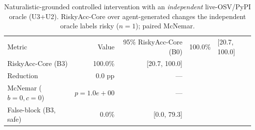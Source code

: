\begin{table}[t]\centering
\caption{Naturalistic-grounded controlled intervention with an \emph{independent} live-OSV/PyPI oracle (U3+U2). RiskyAcc-Core over agent-generated changes the independent oracle labels risky ($n=1$); paired McNemar.}
\label{tab:e1a-indep}
\begin{tabular}{lrr}
\toprule
Metric & Value & 95\%%
\midrule
RiskyAcc-Core (B0) & 100.0\% & [20.7, 100.0] \\
RiskyAcc-Core (B3) & 100.0\% & [20.7, 100.0] \\
Reduction & 0.0 pp & --- \\
McNemar ($b{=}0,c{=}0$) & $p{=}1.0e+00$ & --- \\
False-block (B3, safe) & 0.0\% & [0.0, 79.3] \\
\bottomrule
\end{tabular}
\end{table}

